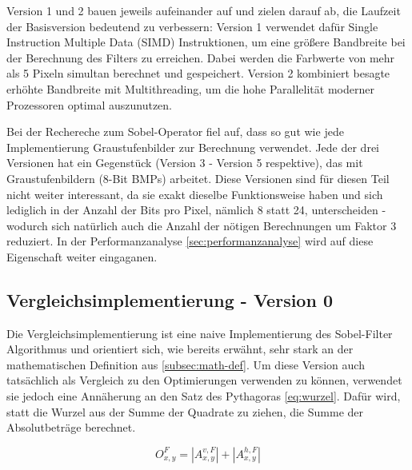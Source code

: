 \documentclass[course=erap]{aspdoc}
\begin{document}
Version 1 und 2 bauen jeweils aufeinander auf und zielen darauf ab, die Laufzeit der Basisversion bedeutend zu verbessern:
Version 1 verwendet dafür Single Instruction Multiple Data (SIMD) Instruktionen, um eine größere Bandbreite bei der Berechnung des Filters zu erreichen.
Dabei werden die Farbwerte von mehr als 5 Pixeln simultan berechnet und gespeichert.
Version 2 kombiniert besagte erhöhte Bandbreite mit Multithreading, um die hohe Parallelität moderner Prozessoren optimal auszunutzen.

Bei der Rechereche zum Sobel-Operator fiel auf, dass so gut wie jede Implementierung Graustufenbilder zur Berechnung verwendet.
Jede der drei Versionen hat ein Gegenstück (Version 3 - Version 5 respektive), das mit Graustufenbildern (8-Bit BMPs) arbeitet.
Diese Versionen sind für diesen Teil nicht weiter interessant, da sie exakt dieselbe Funktionsweise haben und sich lediglich in der Anzahl der Bits pro Pixel, nämlich 8 statt 24, unterscheiden - wodurch sich natürlich auch die Anzahl der nötigen Berechnungen um Faktor 3 reduziert.
In der Performanzanalyse \ref{sec:performanzanalyse} wird auf diese Eigenschaft weiter eingaganen.
\label{text:grayscale}

\subsection{Vergleichsimplementierung - Version 0}
\label{subsec:vergleichsimplementierung}
Die Vergleichsimplementierung ist eine naive Implementierung des Sobel-Filter Algorithmus und orientiert sich, wie bereits erwähnt, sehr stark an der mathematischen Definition aus \ref{subsec:math-def}.
Um diese Version auch tatsächlich als Vergleich zu den Optimierungen verwenden zu können, verwendet sie jedoch eine Annäherung an den Satz des Pythagoras \ref{eq:wurzel}.
Dafür wird, statt die Wurzel aus der Summe der Quadrate zu ziehen, die Summe der Absolutbeträge berechnet.

\begin{equation}
    O^{F}_{x,y} = \left | A^{v,F}_{x,y} \right | + \left | A^{h,F}_{x,y} \right |
    \label{eq:betrag}
\end{equation}
\end{document}
